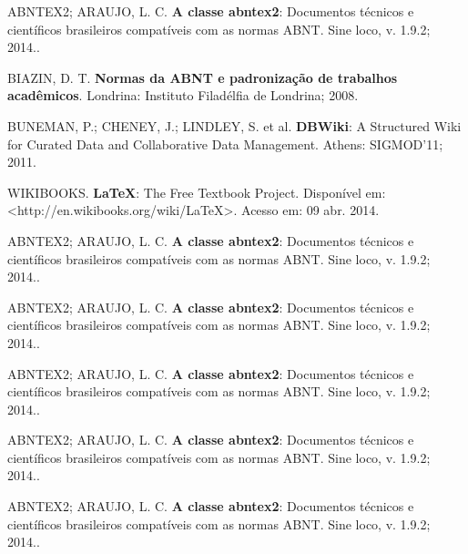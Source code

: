 \documentclass[12pt,openright,oneside,a4paper,english,spanish,brazil]{unifil}
\begin{document}
  

\begin{thebibliography}{99}

{ABNTEX2; ARAUJO, L. C. \textbf{A classe abntex2}: Documentos técnicos e científicos brasileiros compatíveis com as normas ABNT. Sine loco, v. 1.9.2; 2014.}.

{BIAZIN, D. T. \textbf{Normas da ABNT e padronização de trabalhos acadêmicos}. Londrina: Instituto Filadélfia de Londrina; 2008.}

{BUNEMAN, P.; CHENEY, J.; LINDLEY, S. et al. \textbf{DBWiki}: A Structured Wiki for Curated Data and Collaborative Data Management. Athens: SIGMOD’11; 2011.}

{WIKIBOOKS. \textbf{LaTeX}: The Free Textbook Project. Disponível em: <http://en.wikibooks.org/wiki/LaTeX>. Acesso em: 09 abr. 2014.}

{ABNTEX2; ARAUJO, L. C. \textbf{A classe abntex2}: Documentos técnicos e científicos brasileiros compatíveis com as normas ABNT. Sine loco, v. 1.9.2; 2014.}.

{ABNTEX2; ARAUJO, L. C. \textbf{A classe abntex2}: Documentos técnicos e científicos brasileiros compatíveis com as normas ABNT. Sine loco, v. 1.9.2; 2014.}.

{ABNTEX2; ARAUJO, L. C. \textbf{A classe abntex2}: Documentos técnicos e científicos brasileiros compatíveis com as normas ABNT. Sine loco, v. 1.9.2; 2014.}.

{ABNTEX2; ARAUJO, L. C. \textbf{A classe abntex2}: Documentos técnicos e científicos brasileiros compatíveis com as normas ABNT. Sine loco, v. 1.9.2; 2014.}.

{ABNTEX2; ARAUJO, L. C. \textbf{A classe abntex2}: Documentos técnicos e científicos brasileiros compatíveis com as normas ABNT. Sine loco, v. 1.9.2; 2014.}.

\end{thebibliography}
\end{document}
